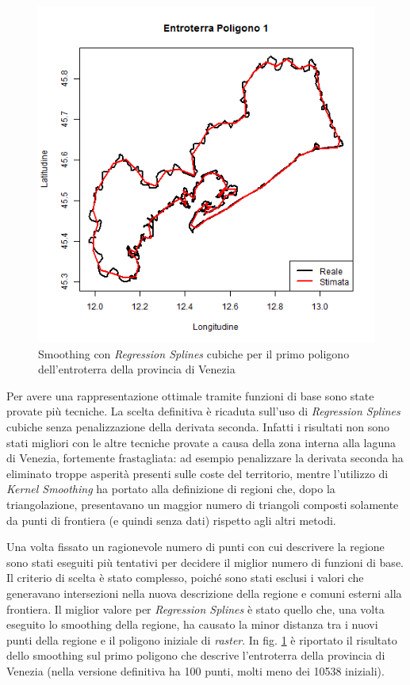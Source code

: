\documentclass[a4paper,11pt,twoside,openright]{book}							%
\begin{document}
\begin{figure}[t]
\begin{minipage}{.32\textwidth}
	\end{minipage}%
	\begin{minipage}{.64\textwidth}
	\includegraphics[width=\textwidth]{Immagini/Ven_Regione.png}
	\end{minipage}
	\caption{Smoothing con \textit{Regression Splines} cubiche per il primo poligono dell'entroterra della provincia di Venezia}
	\label{fig:Ven_ent1}
\end{figure}

Per avere una rappresentazione ottimale tramite funzioni di base sono state provate più tecniche. La scelta definitiva è ricaduta sull'uso di \textit{Regression Splines} cubiche senza penalizzazione della derivata seconda. Infatti i risultati non sono stati migliori con le altre tecniche provate a causa della zona interna alla laguna di Venezia, fortemente frastagliata: ad esempio penalizzare la derivata seconda ha eliminato troppe asperità presenti sulle coste del territorio, mentre l'utilizzo di \textit{Kernel Smoothing} ha portato alla definizione di regioni che, dopo la triangolazione, presentavano un maggior numero di triangoli composti solamente da punti di frontiera (e quindi senza dati) rispetto agli altri metodi.

Una volta fissato un ragionevole numero di punti con cui descrivere la regione sono stati eseguiti più tentativi per decidere il miglior numero di funzioni di base. Il criterio di scelta è stato complesso, poiché sono stati esclusi i valori che generavano intersezioni nella nuova descrizione della regione e comuni esterni alla frontiera. Il miglior valore per \textit{Regression Splines} è stato quello che, una volta eseguito lo smoothing della regione, ha causato la minor distanza tra i nuovi punti della regione e il poligono iniziale di \textit{raster}. In fig. \ref{fig:Ven_ent1} è riportato il risultato dello smoothing sul primo poligono che descrive l'entroterra della provincia di Venezia (nella versione definitiva ha 100 punti, molti meno dei 10538 iniziali).  
\end{document}
